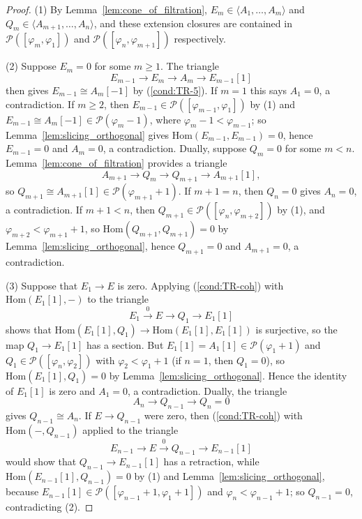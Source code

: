 \documentclass[12pt]{amsart}
\newcommand{\condref}[1]{\textup{(\ref{#1})}}
\numberwithin{theorem}{section}
\theoremstyle{definition}
\newcommand{\calP}{\mathcal{P}}
\newcommand{\Hom}{\mathrm{Hom}}
\begin{document}
	\begin{proof}
		(1) By Lemma~\ref{lem:cone_of_filtration}, $E_m \in \langle A_1, \ldots, A_m \rangle$ and $Q_m \in \langle A_{m+1}, \ldots, A_n \rangle$, and these extension closures are contained in $\calP([\varphi_m, \varphi_1])$ and $\calP([\varphi_n, \varphi_{m+1}])$ respectively.

		(2) Suppose $E_m = 0$ for some $m \geqslant 1$.
		The triangle 
		\[
		E_{m-1} \to E_m \to A_m \to E_{m-1}[1]
		\] 
		then gives $E_{m-1} \cong A_m[-1]$ by \condref{cond:TR-5}.
		If $m = 1$ this says $A_1 = 0$, a contradiction.
		If $m \geqslant 2$, then $E_{m-1} \in \calP([\varphi_{m-1}, \varphi_1])$ by (1) and $E_{m-1} \cong A_m[-1] \in \calP(\varphi_m - 1)$, where $\varphi_m - 1 < \varphi_{m-1}$;
		so Lemma~\ref{lem:slicing_orthogonal} gives $\Hom(E_{m-1}, E_{m-1}) = 0$, hence $E_{m-1} = 0$ and $A_m = 0$, a contradiction.
		Dually, suppose $Q_m = 0$ for some $m < n$.
		Lemma~\ref{lem:cone_of_filtration} provides a triangle
		\[
		A_{m+1} \to Q_m \to Q_{m+1} \to A_{m+1}[1] ,
		\]
		so $Q_{m+1} \cong A_{m+1}[1] \in \calP(\varphi_{m+1} + 1)$.
		If $m + 1 = n$, then $Q_n = 0$ gives $A_n = 0$, a contradiction.
		If $m + 1 < n$, then $Q_{m+1} \in \calP([\varphi_n, \varphi_{m+2}])$ by (1), and $\varphi_{m+2} < \varphi_{m+1} + 1$, so $\Hom(Q_{m+1}, Q_{m+1}) = 0$ by Lemma~\ref{lem:slicing_orthogonal}, hence $Q_{m+1} = 0$ and $A_{m+1} = 0$, a contradiction.

		(3) Suppose that $E_1 \to E$ is zero.
		Applying \condref{cond:TR-coh} with $\Hom(E_1[1], -)$ to the triangle
		\[
		E_1 \xrightarrow{0} E \to Q_1 \to E_1[1]
		\] 
		shows that $\Hom(E_1[1], Q_1) \to \Hom(E_1[1], E_1[1])$ is surjective, so the map $Q_1 \to E_1[1]$ has a section.
		But $E_1[1] = A_1[1] \in \calP(\varphi_1 + 1)$ and $Q_1 \in \calP([\varphi_n, \varphi_2])$ with $\varphi_2 < \varphi_1 + 1$ (if $n = 1$, then $Q_1 = 0$), so $\Hom(E_1[1], Q_1) = 0$ by Lemma~\ref{lem:slicing_orthogonal}.
		Hence the identity of $E_1[1]$ is zero and $A_1 = 0$, a contradiction.
		Dually, the triangle 
		\[
		A_n \to Q_{n-1} \to Q_n = 0
		\] 
		gives $Q_{n-1} \cong A_n$.
		If $E \to Q_{n-1}$ were zero, then \condref{cond:TR-coh} with $\Hom(-, Q_{n-1})$ applied to the triangle 
		\[
		E_{n-1} \to E \xrightarrow{0} Q_{n-1} \to E_{n-1}[1]
		\] 
		would show that $Q_{n-1} \to E_{n-1}[1]$ has a retraction, while $\Hom(E_{n-1}[1], Q_{n-1}) = 0$ by (1) and Lemma~\ref{lem:slicing_orthogonal}, because $E_{n-1}[1] \in \calP([\varphi_{n-1} + 1, \varphi_1 + 1])$ and $\varphi_n < \varphi_{n-1} + 1$;
		so $Q_{n-1} = 0$, contradicting (2).
	\end{proof}
\end{document}
